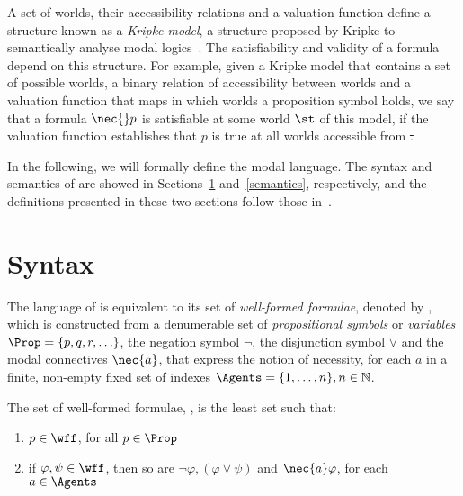 A set of worlds, their accessibility relations and a valuation function define a
structure known as a \emph{Kripke model}, a structure proposed by Kripke to
semantically analyse modal logics~\cite{kripke:i}.  The satisfiability and
validity of a formula depend on this structure. For example, given a Kripke
model that contains a set of possible worlds, a binary relation of accessibility
between worlds and a valuation function that maps in which worlds a proposition
symbol holds, we say that a formula $\nec{}p$ is satisfiable at some world $\st$
of this model, if the valuation function establishes that $p$ is true at all
worlds accessible from \st.

In the following, we will formally define the modal language. The
syntax and semantics of  are showed in Sections~\ref{syntax}
and~\ref{semantics}, respectively, and the definitions presented in these two
sections follow those in~\cite{journals/jal/NalonD07}.

\section{Syntax}%
\label{syntax}

The language of  is equivalent to its set of \emph{well-formed
formulae}, denoted by \wff, which is constructed from a denumerable set of
\emph{propositional symbols} or \emph{variables} $\Prop = \{p, q, r, \ldots\}$,
the negation symbol $\neg$, the disjunction symbol $\lor$ and the modal
connectives $\nec{a}$, that express the notion of necessity, for each $a$
in a finite, non-empty fixed set of indexes $\Agents = \{1, \ldots, n\}, n \in
\mathbb{N}$.

\begin{definition}%
\label{def:wff}
    The set of well-formed formulae, \wff, is the least set such that:
    \begin{enumerate}
        \item $p \in \wff$, for all $p \in \Prop$
            \vspace{.2ex}
        \item if $\varphi, \psi \in \wff$, then so are $\neg \varphi, (\varphi
            \lor \psi)$ and $\nec{a} \varphi$, for each $a \in \Agents$
    \end{enumerate}
\end{definition}

